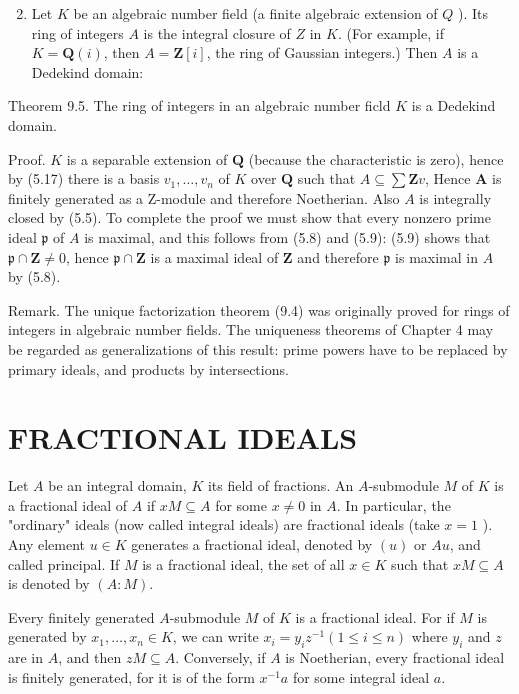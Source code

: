 \documentclass{standalone}
\theoremstyle{definition}
\theoremstyle{remark}
\begin{document}
\begin{enumerate}
  \setcounter{enumi}{1}
  \item Let $K$ be an algebraic number field (a finite algebraic extension of $Q$ ). Its ring of integers $A$ is the integral closure of $Z$ in $K$. (For example, if $K=\mathbf{Q}(i)$, then $A=\mathbf{Z}[i]$, the ring of Gaussian integers.) Then $A$ is a Dedekind domain:
\end{enumerate}

Theorem 9.5. The ring of integers in an algebraic number ficld $K$ is a Dedekind domain.

Proof. $K$ is a separable extension of $\mathbf{Q}$ (because the characteristic is zero), hence by (5.17) there is a basis $v_{1}, \ldots, v_{n}$ of $K$ over $\mathbf{Q}$ such that $A \subseteq \sum \mathbf{Z} v$, Hence $\boldsymbol{A}$ is finitely generated as a Z-module and therefore Noetherian. Also $A$ is integrally closed by (5.5). To complete the proof we must show that every nonzero prime ideal $\mathfrak{p}$ of $A$ is maximal, and this follows from (5.8) and (5.9): (5.9) shows that $\mathfrak{p} \cap \mathbf{Z} \neq 0$, hence $\mathfrak{p} \cap \mathbf{Z}$ is a maximal ideal of $\mathbf{Z}$ and therefore $\mathfrak{p}$ is maximal in $A$ by (5.8).

Remark. The unique factorization theorem (9.4) was originally proved for rings of integers in algebraic number fields. The uniqueness theorems of Chapter 4 may be regarded as generalizations of this result: prime powers have to be replaced by primary ideals, and products by intersections.

\section{FRACTIONAL IDEALS}
Let $A$ be an integral domain, $K$ its field of fractions. An $A$-submodule $M$ of $K$ is a fractional ideal of $A$ if $x M \subseteq A$ for some $x \neq 0$ in $A$. In particular, the "ordinary" ideals (now called integral ideals) are fractional ideals (take $x=1$ ). Any element $u \in K$ generates a fractional ideal, denoted by $(u)$ or $A u$, and called principal. If $M$ is a fractional ideal, the set of all $x \in K$ such that $x M \subseteq A$ is denoted by $(A: M)$.

Every finitely generated $A$-submodule $M$ of $K$ is a fractional ideal. For if $M$ is generated by $x_{1}, \ldots, x_{n} \in K$, we can write $x_{i}=y_{i} z^{-1}(1 \leqslant i \leqslant n)$ where $y_{i}$ and $z$ are in $A$, and then $z M \subseteq A$. Conversely, if $A$ is Noetherian, every fractional ideal is finitely generated, for it is of the form $x^{-1} a$ for some integral ideal $a$.
\end{document}

